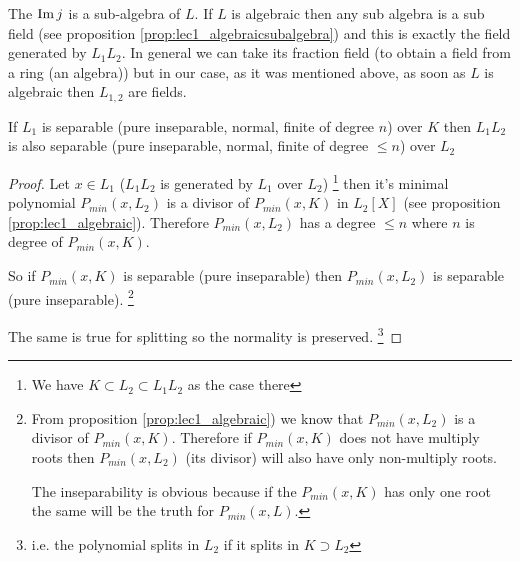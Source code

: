 The 
 $\operatorname{Im} j$ is a sub-algebra of $L$. If $L$ is
algebraic then any sub algebra is a sub field (see proposition
\ref{prop:lec1_algebraicsubalgebra}) and this 
is exactly the field generated by $L_1 L_2$. In general we can take
its fraction field (to obtain a field from a ring (an algebra)) but in
our case, as it was mentioned above, as soon as $L$ is algebraic then
$L_{1,2}$ are fields.

\begin{property}
  If $L_1$ is separable (pure inseparable, normal, finite of
  degree $n$) over $K$ then $L_1 L_2$ is also separable (pure
  inseparable, normal, finite of degree $ \le n$) over $L_2$
  \begin{proof}
    Let $x \in L_1$ ($L_1 L_2$ is generated by $L_1$ over $L_2$)
    \footnote{
      We have $K \subset L_2 \subset L_1 L_2$ as the case there
    }
    then it's minimal polynomial $P_{min}\left(x, L_2\right)$ is a
    divisor of $P_{min}\left(x, K\right)$ in
    $L_2\left[X\right]$ (see proposition \ref{prop:lec1_algebraic}). 
    Therefore $P_{min}\left(x, L_2\right)$ has a
    degree $\le n$ where $n$ 
    is degree of $P_{min}\left(x, K\right)$.

    So if $P_{min}\left(x, K\right)$ is separable (pure inseparable)
    then $P_{min}\left(x, L_2\right)$ is separable (pure inseparable).
    \footnote{
      From proposition \ref{prop:lec1_algebraic}) we know that
      $P_{min}\left(x, L_2\right)$ is a divisor of $P_{min}\left(x,
      K\right)$. Therefore if $P_{min}\left(x, K\right)$ does not have
      multiply roots then $P_{min}\left(x, L_2\right)$ (its divisor)
      will also have only non-multiply roots.

      The inseparability is obvious because if the
      $P_{min}\left(x,K\right)$ has only one root the same will be the
      truth for $P_{min}\left(x, L\right)$.
    }

    The same is true for splitting so the normality is preserved.
    \footnote{
      i.e. the polynomial splits in $L_2$ if it splits in $K \supset L_2$
    }


\end{proof}
\end{property}
